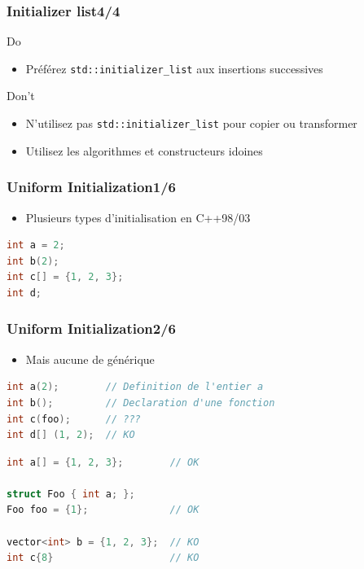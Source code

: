 \documentclass[C++.tex]{subfiles}
\begin{document}
\begin{frame}[fragile]
\frametitle{Initializer list\titlehfill{}4/4}
	\begin{exampleblock}{Do}
		\begin{itemize}
			\item Préférez \lstinline|std::initializer_list| aux insertions successives
		\end{itemize}
	\end{exampleblock}

	\pause

	\begin{alertblock}{Don't}
		\begin{itemize}
			\item N'utilisez pas \lstinline|std::initializer_list| pour copier ou transformer
			\item Utilisez les algorithmes et constructeurs idoines
		\end{itemize}

	\end{alertblock}
\end{frame}

\begin{frame}[fragile]
	\frametitle{Uniform Initialization\titlehfill{}1/6}
	\begin{itemize}
		\item Plusieurs types d'initialisation en C++98/03
	\end{itemize}

	\begin{lstlisting}[language=C++]
int a = 2;
int b(2);
int c[] = {1, 2, 3};
int d;\end{lstlisting}
\end{frame}

\begin{frame}[fragile]
	\frametitle{Uniform Initialization\titlehfill{}2/6}
	\begin{itemize}
		\item Mais aucune de générique
	\end{itemize}

	\begin{lstlisting}[language=C++]
int a(2);        // Definition de l'entier a
int b();         // Declaration d'une fonction
int c(foo);      // ???
int d[] (1, 2);  // KO\end{lstlisting}


	\pause

	\begin{lstlisting}[language=C++]
int a[] = {1, 2, 3};        // OK

struct Foo { int a; };
Foo foo = {1};              // OK

vector<int> b = {1, 2, 3};  // KO
int c{8}                    // KO\end{lstlisting}

\end{frame}
\end{document}
